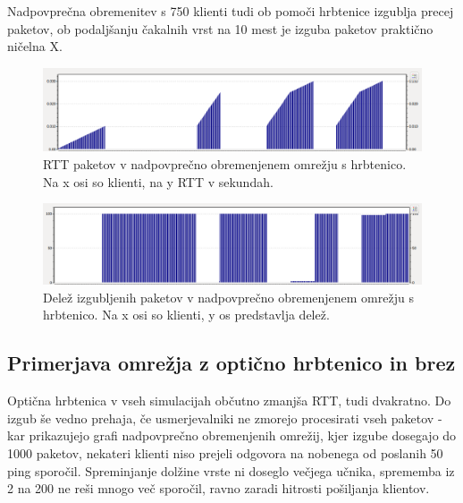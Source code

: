 \documentclass[11pt, a4paper, slovene]{book}
\begin{document}
\pagebreak

Nadpovprečna obremenitev s 750 klienti tudi ob pomoči hrbtenice izgublja precej paketov, ob podaljšanju čakalnih vrst na 10 mest je izguba paketov praktično ničelna X.

\begin{figure}[h]
	\centering
	\includegraphics[width=\textwidth]{hRtt2.png}
	\caption{RTT paketov v nadpovprečno obremenjenem omrežju s hrbtenico. Na x osi so klienti, na y RTT v sekundah.}
	\label{RTT6}	
\end{figure}

\begin{figure}[h]
	\centering
	\includegraphics[width=\textwidth]{hLoss2.png}
	\caption{Delež izgubljenih paketov v nadpovprečno obremenjenem omrežju s hrbtenico. Na x osi so klienti, y os predstavlja delež.}
	\label{hPL2}	
\end{figure}

\subsection{Primerjava omrežja z optično hrbtenico in brez} 
Optična hrbtenica v vseh simulacijah občutno zmanjša RTT, tudi dvakratno. Do izgub še vedno prehaja, če usmerjevalniki ne zmorejo procesirati vseh paketov - kar prikazujejo grafi nadpovprečno obremenjenih omrežij, kjer izgube dosegajo do 1000 paketov, nekateri klienti niso prejeli odgovora na nobenega od poslanih 50 ping sporočil. Spreminjanje dolžine vrste ni doseglo večjega učnika, sprememba iz 2 na 200 ne reši mnogo več sporočil, ravno zaradi hitrosti pošiljanja klientov.
\end{document}
